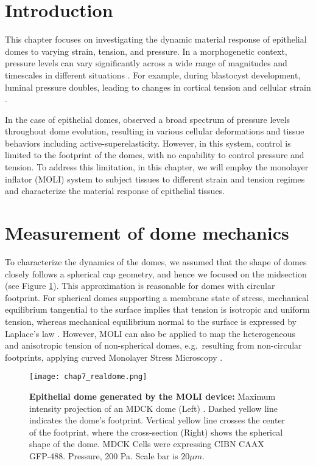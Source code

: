 \hypertarget{introduction}{%
	\section{Introduction}\label{introduction7}}

This chapter focuses on investigating the dynamic material response of epithelial domes to varying strain, tension, and pressure. In a morphogenetic context, pressure levels can vary significantly across a wide range of magnitudes and timescales in different situations \cite{torres-sanchez2021, choudhury2022a}. For example, during blastocyst development, luminal pressure doubles, leading to changes in cortical tension and cellular strain \cite{chan2019}.

In the case of epithelial domes, \citet{latorre2018} observed a broad spectrum of pressure levels throughout dome evolution, resulting in various cellular deformations and tissue behaviors including active-superelasticity. However, in this system, control is limited to the footprint of the domes, with no capability to control pressure and tension. To address this limitation, in this chapter, we will employ the monolayer inflator (MOLI) system to subject tissues to different strain and tension regimes and characterize the material response of epithelial tissues.

\hypertarget{measurement-of-dome-mechanics}{%
	\section{Measurement of dome mechanics}\label{measurement-of-dome-mechanics}}

To characterize the dynamics of the domes, we assumed that the shape of domes closely follows a spherical cap geometry, and hence we focused on the midsection (see Figure \ref{fig_7_1}). This  approximation is reasonable for domes with circular footprint. For spherical domes  supporting a membrane state of stress, mechanical equilibrium tangential to the surface implies that tension is isotropic and uniform tension, whereas mechanical equilibrium normal to the surface is expressed by Laplace's law \cite{latorre2018}. However, MOLI can also be applied to map the  heterogeneous and anisotropic tension of non-spherical domes, e.g.~resulting from non-circular footprints, applying curved Monolayer Stress Microscopy \cite{marin-llaurado2022}.

\begin{figure}
	\centering
	\texttt{[image: chap7\_realdome.png]}
	\caption{\textbf{Epithelial dome generated by the MOLI device:} Maximum intensity projection of an MDCK dome (Left) . Dashed yellow line indicates the dome's footprint. Vertical yellow line crosses the center of the footprint, where the cross-section   (Right) shows the spherical shape of the dome. MDCK Cells were expressing CIBN CAAX GFP-488. Pressure, 200 Pa. Scale bar is $20 \mu m$.
	} \label{fig_7_1}
\end{figure}

